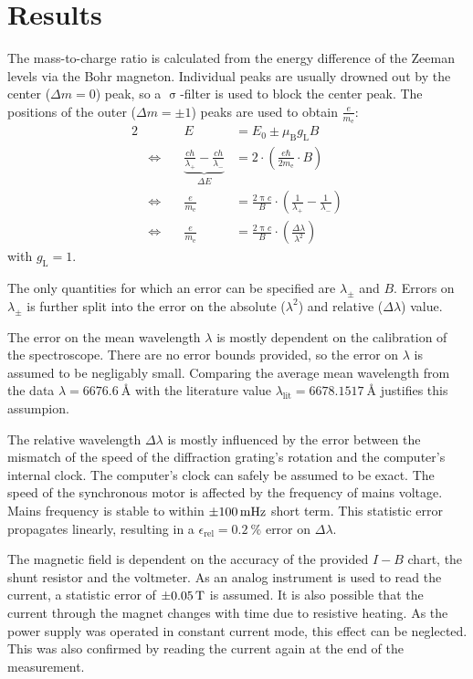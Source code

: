 \chapter{Results}
The mass-to-charge ratio is calculated from the energy difference of the Zeeman levels via the Bohr magneton.
Individual peaks are usually drowned out by the center ($\Delta m = 0$) peak, so a $\upsigma$-filter is used to block the center peak.
The positions of the outer ($\Delta m = \pm 1$) peaks are used to obtain $\frac{e}{m_\text{e}}$:
\begin{alignat}{2}
	& &E &= E_0 \pm \mu_\text{B} g_\text{L} B\\
	&\Leftrightarrow \quad &\underbrace{\frac{c h}{\lambda_+} - \frac{c h}{\lambda_-}}_{\Delta E} &=
	2 \cdot \left(\frac{e \hbar}{2 m_\text{e}} \cdot B \right)\\
	&\Leftrightarrow &\frac{e}{m_\text{e}} &= \frac{2 \uppi c}{B} \cdot \left(\frac{1}{\lambda_+} - \frac{1}{\lambda_-}\right)\\
	&\Leftrightarrow &\frac{e}{m_\text{e}} &= \frac{2 \uppi c}{B} \cdot \left(\frac{\Delta \lambda}{\lambda^2}\right)
\end{alignat}
with $g_\text{L} = 1$.

The only quantities for which an error can be specified are $\lambda_\pm$ and $B$.
Errors on $\lambda_\pm$ is further split into the error on the absolute ($\lambda^2$) and relative ($\Delta \lambda$) value.

The error on the mean wavelength $\lambda$ is mostly dependent on the calibration of the spectroscope.
There are no error bounds provided, so the error on $\lambda$ is assumed to be negligably small.
Comparing the average mean wavelength from the data $\lambda = \SI{6676.6}{\angstrom}$ with the literature value $\lambda_\text{lit} = \SI{6678.1517}{\angstrom}$ justifies this assumpion.

The relative wavelength $\Delta \lambda$ is mostly influenced by the error between the mismatch of the speed of the diffraction grating's rotation and the computer's internal clock.
The computer's clock can safely be assumed to be exact.
The speed of the synchronous motor is affected by the frequency of mains voltage.
Mains frequency is stable to within $\SI{\pm 100}{\milli\hertz}$ short term.
This statistic error propagates linearly, resulting in a $\epsilon_\text{rel} = \SI{0.2}{\percent}$ error on $\Delta\lambda$.

The magnetic field is dependent on the accuracy of the provided $I-B$ chart, the shunt resistor and the voltmeter.
As an analog instrument is used to read the current, a statistic error of $\SI{\pm 0.05}{\tesla}$ is assumed.
It is also possible that the current through the magnet changes with time due to resistive heating.
As the power supply was operated in constant current mode, this effect can be neglected.
This was also confirmed by reading the current again at the end of the measurement.

